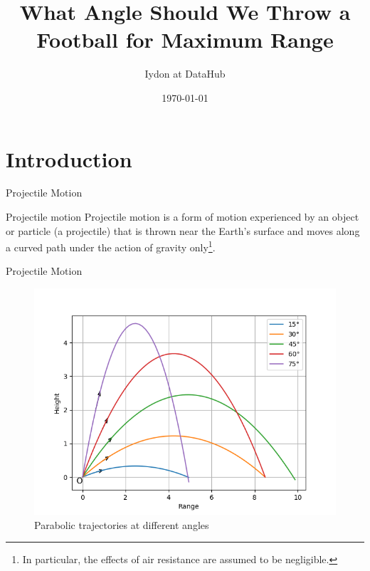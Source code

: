 \title{What Angle Should We Throw a Football for Maximum Range}
\author[Iydon]{Iydon at DataHub}
\date{\today}

\begin{frame}
	\maketitle
\end{frame}



\section{Introduction}
\begin{frame}[t]{Projectile Motion}
    \begin{block}{Projectile motion}
        Projectile motion is a form of motion experienced by an object or particle (a projectile) that is thrown near the Earth’s surface and moves along a curved path under the action of gravity only\footnote{In particular, the effects of air resistance are assumed to be negligible.}.
    \end{block}
\end{frame}

\begin{frame}{Projectile Motion}
    \begin{figure}
        \centering
        \includegraphics[width=.7\textwidth]{../figures/quadratic_equation-1.png}
        \caption{Parabolic trajectories at different angles}
    \end{figure}
\end{frame}



